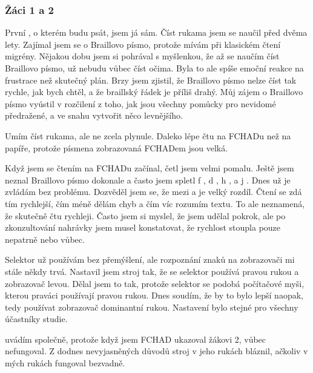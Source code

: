 \subsubsection{Žáci 1 a 2}

První , o kterém budu psát, jsem já sám.  Číst rukama jsem se naučil před dvěma lety. Zajímal jsem se o Braillovo písmo, protože mívám při klasickém čtení migrény.  Nějakou dobu jsem si pohrával s myšlenkou, že až se naučím číst Braillovo písmo, už nebudu vůbec číst očima.  Byla to ale spíše emoční reakce na frustrace než skutečný plán.  Brzy jsem zjistil, že Braillovo písmo nelze číst tak rychle, jak bych chtěl, a že braillský řádek je příliš drahý.  Můj zájem o Braillovo písmo vyústil v rozčilení z toho, jak jsou všechny pomůcky pro nevidomé předražené, a ve snahu vytvořit něco levnějšího.

Umím číst rukama, ale ne zcela plynule.  Daleko lépe čtu na FCHADu než na papíře, protože písmena zobrazovaná FCHADem jsou velká.

Když jsem se čtením na FCHADu začínal, četl jsem velmi pomalu.  Ještě jsem neznal Braillovo písmo dokonale a často jsem spletl f , d , h , a j . Dnes už je zvládám bez problému.  Dozvěděl jsem se, že mezi  a  je velký rozdíl.  Čtení se zdá tím rychlejší, čím méně dělám chyb a čím víc rozumím textu. To ale neznamená, že skutečně čtu rychleji. Často jsem si myslel, že jsem udělal pokrok, ale po zkonzultování nahrávky jsem musel konstatovat, že rychlost stoupla pouze nepatrně nebo vůbec.

Selektor už používám bez přemýšlení, ale rozpoznání znaků na zobrazovači mi stále někdy trvá.  Nastavil jsem stroj tak, že se selektor používá pravou rukou a zobrazovač levou. Dělal jsem to tak, protože selektor se podobá počítačové myši, kterou praváci používají pravou rukou.  Dnes soudím, že by to bylo lepší naopak, tedy používat zobrazovač dominantní rukou.  Nastavení bylo stejné pro všechny účastníky studie.

 uvádím společně, protože když jsem FCHAD ukazoval žákovi 2, vůbec nefungoval. Z dodnes nevyjasněných důvodů stroj v jeho rukách bláznil, ačkoliv v mých rukách fungoval bezvadně.



